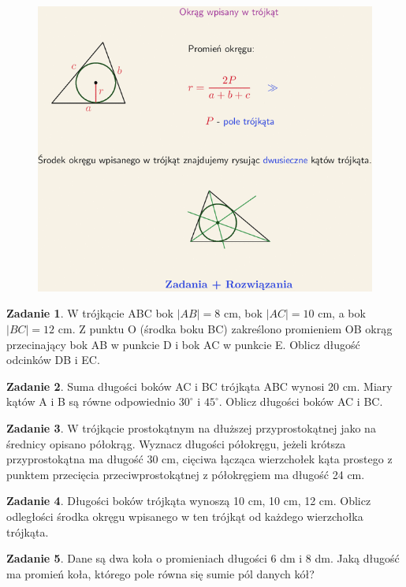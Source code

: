 \documentclass[11pt]{article}
\theoremstyle{definition}
\newtheorem{zad}{Zadanie}
\begin{document}
\begin{figure}
\centering
\includegraphics[width=0.8\linewidth]{circle2.png}
\end{figure}

\begin{zad}
W trójkącie ABC bok $|AB| = 8$ cm, bok $|AC| = 10$ cm, a bok $|BC| = 12$ cm. Z punktu O (środka boku BC) zakreślono promieniem OB okrąg przecinający bok AB w punkcie D i bok AC w punkcie E. Oblicz długość odcinków DB i EC.
\end{zad}

\begin{zad}
Suma długości boków AC i BC trójkąta ABC wynosi 20 cm. Miary kątów A i B są równe odpowiednio $30^\circ$ i $45^\circ$. Oblicz długości boków AC i BC.
\end{zad}

\begin{zad}
W trójkącie prostokątnym na dłuższej przyprostokątnej jako na średnicy opisano półokrąg. Wyznacz długości półokręgu, jeżeli krótsza przyprostokątna ma długość 30 cm, cięciwa łącząca wierzchołek kąta prostego z punktem przecięcia przeciwprostokątnej z półokręgiem ma długość 24 cm.
\end{zad}

\begin{zad}
Długości boków trójkąta wynoszą 10 cm, 10 cm, 12 cm. Oblicz odległości środka okręgu wpisanego w ten trójkąt od każdego wierzchołka trójkąta.
\end{zad}

\begin{zad}
Dane są dwa koła o promieniach długości 6 dm i 8 dm. Jaką długość ma promień koła, którego pole równa się sumie pól danych kół?
\end{zad}
\end{document}
